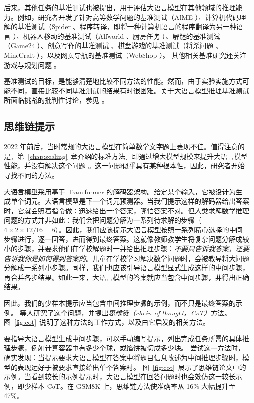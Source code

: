 后来，其他任务的基准测试也被提出，用于评估大语言模型在其他领域的推理能力。例如，研究者开发了针对高等数学问题的基准测试（AIME \citep{codeforcesamerican}）、计算机代码理解的基准测试（Spider \citep{yu2018spider}、程序转译，即将一种计算机语言的程序翻译为另一种语言 \citep{roziere2020unsupervised}）、机器人移动的基准测试（Alfworld \citep{shridhar2020alfworld}、厨房任务 \citep{ahn2022can}）、解谜的基准测试（Game24 \citep{yao2024tree}）、创意写作的基准测试 \citep{yao2024tree}、棋盘游戏的基准测试（将杀问题 \citep{yang2024buffer}、MineCraft \citep{fan2022minedojo}），以及网页导航的基准测试（WebShop \citep{yao2022webshop}）。
其他相关基准研究还关注游戏与规划问题 \citep{ruoss2024lmact,paglieri2024balrog,wen2025thinkpatterns}。

基准测试的目标，是能够清楚地比较不同方法的性能。然而，由于实验实施方式可能不同，直接比较不同基准测试的结果有时很困难。关于大语言模型推理基准测试所面临挑战的批判性讨论，参见 \citet{kamoi2024can,shojaee2025illusion}。

\subsection{思维链提示}
2022 年前后，当时常规的大语言模型在简单数学文字题上表现不佳。值得注意的是，第~\ref{chap:scaling}~章介绍的标准方法，即通过增大模型规模来提升大语言模型性能，并没有解决这个问题 \citep{rae2021scaling}。这一问题似乎具有某种根本性，因此，研究者开始寻找不同的方法。

大语言模型采用基于 Transformer 的解码器架构。给定某个输入，它被设计为生成单个词元。大语言模型是下一个词元预测器。当我们提示这样的解码器给出答案时，它就会照着指令做：迅速给出一个答案，哪怕答案不对。但人类求解数学推理问题的方式并非如此：我们会把问题分解为一系列待求解的步骤（$4\times 2\times 12/16=6$）。因此，我们应该提示大语言模型按照一系列精心选择的中间步骤进行，逐一回答，进而得到最终答案。这就像教师教学生将复杂问题分解成较小的步骤，并要求他们在学校解题时一并给出推理步骤：{\em 不要只告诉我答案，还要告诉我你是如何{\em 得到}答案的}。儿童在学校学习解决数学问题时，会被教导将大问题分解成一系列小步骤。同样，我们也应该引导语言模型显式生成这样的中间步骤，再合并各步结果。如此一来，大语言模型的答案就应当包含中间步骤，并得出正确结果。

因此，我们的少样本提示应当包含中间推理步骤的示例，而不只是最终答案的示例。
\citet{wei2022chain} 等人研究了这个问题，并提出{\em 思维链（chain of thought，CoT）}方法。图~\ref{fig:cot}~说明了这种方法的工作方式，以及由它启发的相关方法。

要指导大语言模型生成中间步骤，可以手动编写提示，列出完成任务所需的具体推理步骤，例如计算容器中有多少个球，或馅饼被切成多少块。
\citet{wei2022chain} 尝试这一方法时，确实发现：当提示要求大语言模型在答案中将题目信息改述为中间推理步骤时，模型的表现远好于被要求直接给出单个答案时。
图~\ref{fig:cot}~展示了思维链论文中的示例。当看到较长的示例提示时，大语言模型在回答问题时也会效仿这一较长示例，即少样本 CoT。在 GSM8K 上，思维链方法使准确率从 16\% 大幅提升至 47\%。

